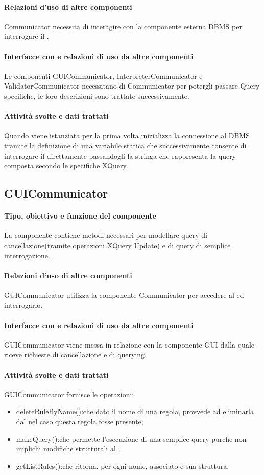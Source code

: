 \documentclass[11pt,titlepage,a4paper]{report}
\begin{document}
\paragraph{Relazioni d'uso di altre componenti}
Communicator necessita di interagire con la componente esterna DBMS per interrogare il \re.
\paragraph{Interfacce con e relazioni di uso da altre componenti}
Le componenti GUICommunicator, InterpreterCommunicator e ValidatorCommunicator necessitano di Communicator per potergli passare Query specifiche, le loro descrizioni sono trattate successivamente.
\paragraph{Attivit\`a svolte e dati trattati}
Quando viene istanziata per la prima volta inizializza la connessione al DBMS tramite la definizione di una variabile statica che successivamente consente di interrogare il \re direttamente passandogli la stringa che rappresenta la query composta secondo le specifiche XQuery.
%
\subsection{GUICommunicator}
\paragraph{Tipo, obiettivo e funzione del componente}
La componente contiene metodi necessari per modellare query di cancellazione(tramite operazioni XQuery Update) e di query di semplice interrogazione.
\paragraph{Relazioni d'uso di altre componenti}
GUICommunicator utilizza la componente Communicator per accedere al \re ed interrogarlo.
\paragraph{Interfacce con e relazioni di uso da altre componenti}
GUICommunicator viene messa in relazione con la componente GUI dalla quale riceve richieste di cancellazione e di querying.%
\paragraph{Attivit\`a svolte e dati trattati}
GUICommunicator fornisce le operazioni:
\begin{itemize}
 \item deleteRuleByName():che dato il nome di una regola, provvede ad eliminarla dal \re nel caso questa regola fosse presente;
 \item makeQuery():che permette l'esecuzione di una semplice query purche non implichi modifiche strutturali al \re;
 \item getListRules():che ritorna, per ogni \br nome, \bo associato e sua struttura.
\end{itemize}
 
\end{document}
